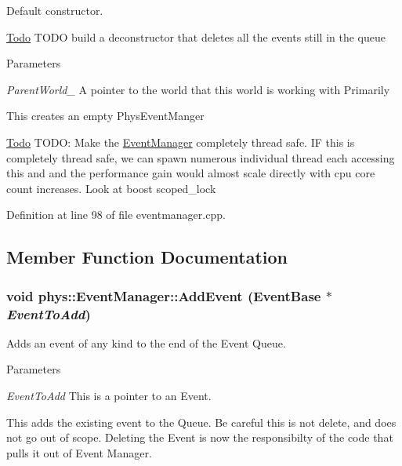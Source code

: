 Default constructor. 

\begin{Desc}
\item[\hyperlink{todo__todo000007}{Todo}]TODO build a deconstructor that deletes all the events still in the queue \end{Desc}

\begin{DoxyParams}{Parameters}
\item[{\em ParentWorld\_\-}]A pointer to the world that this world is working with Primarily\end{DoxyParams}
This creates an empty PhysEventManger

\begin{Desc}
\item[\hyperlink{todo__todo000004}{Todo}]TODO: Make the \hyperlink{classphys_1_1EventManager}{EventManager} completely thread safe. IF this is completely thread safe, we can spawn numerous individual thread each accessing this and and the performance gain would almost scale directly with cpu core count increases. Look at boost scoped\_\-lock \end{Desc}


Definition at line 98 of file eventmanager.cpp.



\subsection{Member Function Documentation}
\hypertarget{classphys_1_1EventManager_abada23d83ef38e59a38eb91a88a07404}{
\subsubsection[{AddEvent}]{\setlength{\rightskip}{0pt plus 5cm}void phys::EventManager::AddEvent ({\bf EventBase} $\ast$ {\em EventToAdd})}}
\label{da/dde/classphys_1_1EventManager_abada23d83ef38e59a38eb91a88a07404}


Adds an event of any kind to the end of the Event Queue. 


\begin{DoxyParams}{Parameters}
\item[{\em EventToAdd}]This is a pointer to an Event.\end{DoxyParams}
This adds the existing event to the Queue. Be careful this is not delete, and does not go out of scope. Deleting the Event is now the responsibilty of the code that pulls it out of Event Manager. 

